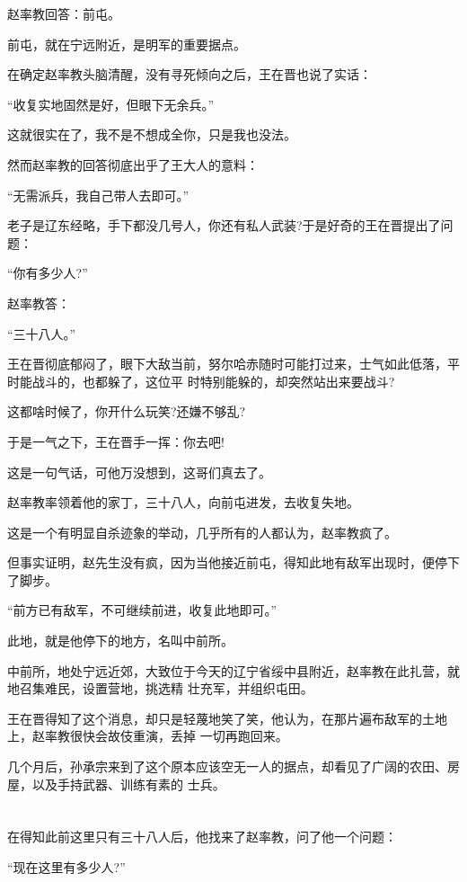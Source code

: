 \documentclass[11pt,a4paper,onecolumn]{article}
\begin{document}
赵率教回答：前屯。

前屯，就在宁远附近，是明军的重要据点。

在确定赵率教头脑清醒，没有寻死倾向之后，王在晋也说了实话：

``收复实地固然是好，但眼下无余兵。''

这就很实在了，我不是不想成全你，只是我也没法。

然而赵率教的回答彻底出乎了王大人的意料：

``无需派兵，我自己带人去即可。''

老子是辽东经略，手下都没几号人，你还有私人武装?于是好奇的王在晋提出了问题：

``你有多少人?''

赵率教答：

``三十八人。''

王在晋彻底郁闷了，眼下大敌当前，努尔哈赤随时可能打过来，士气如此低落，平时能战斗的，也都躲了，这位平
时特别能躲的，却突然站出来要战斗?

这都啥时候了，你开什么玩笑?还嫌不够乱?

于是一气之下，王在晋手一挥：你去吧!

这是一句气话，可他万没想到，这哥们真去了。

赵率教率领着他的家丁，三十八人，向前屯进发，去收复失地。

这是一个有明显自杀迹象的举动，几乎所有的人都认为，赵率教疯了。

但事实证明，赵先生没有疯，因为当他接近前屯，得知此地有敌军出现时，便停下了脚步。

``前方已有敌军，不可继续前进，收复此地即可。''

此地，就是他停下的地方，名叫中前所。

中前所，地处宁远近郊，大致位于今天的辽宁省绥中县附近，赵率教在此扎营，就地召集难民，设置营地，挑选精
壮充军，并组织屯田。

王在晋得知了这个消息，却只是轻蔑地笑了笑，他认为，在那片遍布敌军的土地上，赵率教很快会故伎重演，丢掉
一切再跑回来。

几个月后，孙承宗来到了这个原本应该空无一人的据点，却看见了广阔的农田、房屋，以及手持武器、训练有素的
士兵。

\section[\thesection]{}

在得知此前这里只有三十八人后，他找来了赵率教，问了他一个问题：

``现在这里有多少人?''
\end{document}
